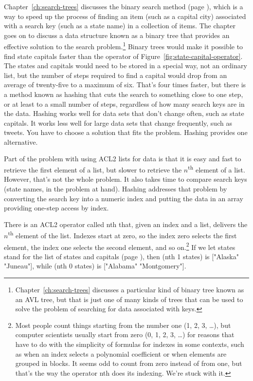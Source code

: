 Chapter~\ref{ch:search-trees} discusses the binary search
method (page \pageref{binary-search-method}),
which is a way to speed up the process of finding an item
(such as a capital city)
associated with a search key (such as a state name) in a
collection of items. The chapter goes on to discuss
a data structure known as a binary tree
that provides an effective solution to the search
problem.\footnote{Chapter~\ref{ch:search-trees}
discusses a particular kind of binary tree known as an AVL tree,
but that is just one of many kinds of trees
that can be used to solve the problem of searching
for data associated with keys.}
Binary trees would make it possible to find
state capitals faster
than the operator of Figure~\ref{fig:state-capital-operator}.
The states and capitals would need to be stored
in a special way, not an ordinary list,
but the number of steps required to find a capital
would drop from an average of twenty-five to a maximum of six.
That's four times faster, but there is a method known as hashing %
that cuts the search to something close to one step, or at least
to a small number of steps, regardless of how
many search keys are in the data.
Hashing works well for data sets that don't change often, %
such as state capitals. It works less well for large
data sets that change frequently, such as tweets.
You have to choose a solution that fits the problem.
Hashing provides one alternative.

Part of the problem with using ACL2 lists
for data is that it is easy and fast to retrieve the
first element of a list, but slower to retrieve the
$n$\textsuperscript{th} element of a list.
However, that's not the whole problem. %
It also takes time to compare search keys
(state names, in the problem at hand).
Hashing addresses that problem by converting the search key
into a numeric index and putting the data
in an array providing one-step access by index.

There is an ACL2 operator called \textsf{nth} that,
given an index and a list, delivers the
$n$\textsuperscript{th} element of the list.
Indexes start at zero, so the index
zero selects the first element,
the index one selects the second element,
and so on.\footnote{Most people
count things starting from the number one (1, 2, 3, \dots), but
computer scientists usually start from zero (0, 1, 2, 3, \dots)
for reasons that have to do with the simplicity
of formulas for indexes in some contexts, such
as when an index selects a polynomial coefficient
or when elements are grouped in blocks.
It seems odd to count from
zero instead of from one,
but that's the way the operator
\textsf{nth} does its indexing. We're stuck with it.}
If we let \textsf{states} stand for the list of states and capitals
(page \pageref{states-capitals-list}), then
\textsf{(nth 1 states)} is \textsf{["Alaska" "Juneau"]},
while \textsf{(nth 0 states)} is \textsf{["Alabama" "Montgomery"]}.

